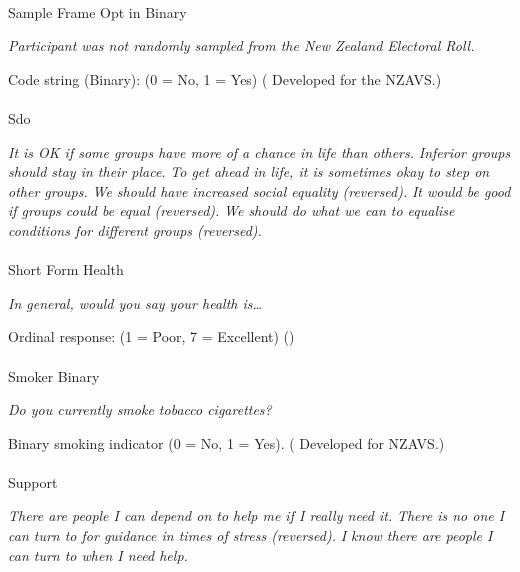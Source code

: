 \documentclass[
  single column]{article}
\makeatletter
\let\oldparagraph\paragraph
\renewcommand{\paragraph}{
    \@ifstar
      \xxxParagraphStar
      \xxxParagraphNoStar
  }
\newcommand{\xxxParagraphStar}[1]{\oldparagraph*{#1}\mbox{}}
\newcommand{\xxxParagraphNoStar}[1]{\oldparagraph{#1}\mbox{}}
\makeatother
\begin{document}
\paragraph{Sample Frame Opt in Binary}\label{sample-frame-opt-in-binary}

\emph{Participant was not randomly sampled from the New Zealand
Electoral Roll.}

Code string (Binary): (0 = No, 1 = Yes)
( Developed for the
NZAVS.)

\paragraph{Sdo}\label{sdo}

\emph{It is OK if some groups have more of a chance in life than
others.} \emph{Inferior groups should stay in their place.} \emph{To get
ahead in life, it is sometimes okay to step on other groups.} \emph{We
should have increased social equality (reversed).} \emph{It would be
good if groups could be equal (reversed).} \emph{We should do what we
can to equalise conditions for different groups (reversed).}

\paragraph{Short Form Health}\label{short-form-health}

\emph{In general, would you say your health is\ldots{}}

Ordinal response: (1 = Poor, 7 = Excellent)
()

\paragraph{Smoker Binary}\label{smoker-binary}

\emph{Do you currently smoke tobacco cigarettes?}

Binary smoking indicator (0 = No, 1 = Yes).
( Developed for NZAVS.)

\paragraph{Support}\label{support}

\emph{There are people I can depend on to help me if I really need it.}
\emph{There is no one I can turn to for guidance in times of stress
(reversed).} \emph{I know there are people I can turn to when I need
help.}
\end{document}
